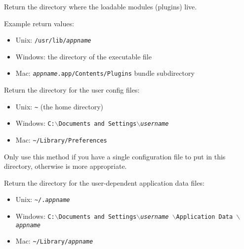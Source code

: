 \label{wxfilelocatorgetpluginsdir}


Return the directory where the loadable modules (plugins) live.

Example return values:
\begin{itemize}
    \item Unix: \texttt{/usr/lib/\textit{appname}}
    \item Windows: the directory of the executable file
    \item Mac: \texttt{\textit{appname}.app/Contents/Plugins} bundle subdirectory
\end{itemize}




\label{wxfilelocatorgetuserconfigdir}


Return the directory for the user config files:
\begin{itemize}
    \item Unix: \texttt{\verb|~|} (the home directory)
    \item Windows: \texttt{C:$\backslash$Documents and Settings$\backslash$\textit{username}}
    \item Mac: \texttt{\verb|~|/Library/Preferences}
\end{itemize}

Only use this method if you have a single configuration file to put in this
directory, otherwise  is
more appropriate.


\label{wxfilelocatorgetuserdatadir}


Return the directory for the user-dependent application data files:
\begin{itemize}
    \item Unix: \texttt{\verb|~|/.\textit{appname}}
    \item Windows: \texttt{C:$\backslash$Documents and Settings$\backslash$\textit{username}
                             $\backslash$Application Data
                             $\backslash$\textit{appname}}
    \item Mac: \texttt{\verb|~|/Library/\textit{appname}}
\end{itemize}


